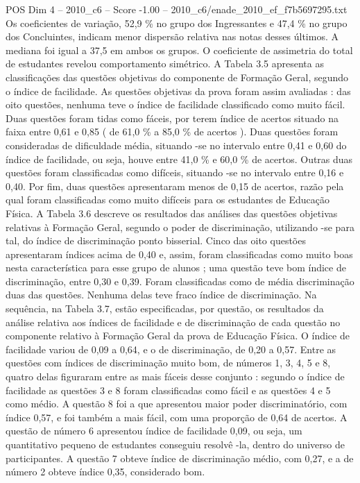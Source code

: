 \begin{textsample}{POS Dim 4 – 2010\_c6 – Score -1.00 – 2010\_c6/enade\_2010\_ef\_f7b5697295.txt}
Os coeficientes de variação, 52,9 \% no grupo dos Ingressantes e 47,4 \% no grupo dos Concluintes, indicam menor dispersão relativa nas notas desses últimos.
A mediana foi igual a 37,5 em ambos os grupos.
O coeficiente de assimetria do total de estudantes revelou comportamento simétrico.
A Tabela 3.5 apresenta as classificações das questões objetivas do componente de Formação Geral, segundo o índice de facilidade.
As questões objetivas da prova foram assim avaliadas : das oito questões, nenhuma teve o índice de facilidade classificado como muito fácil.
Duas questões foram tidas como fáceis, por terem índice de acertos situado na faixa entre 0,61 e 0,85 ( de 61,0 \% a 85,0 \% de acertos ).
Duas questões foram consideradas de dificuldade média, situando -se no intervalo entre 0,41 e 0,60 do índice de facilidade, ou seja, houve entre 41,0 \% e 60,0 \% de acertos.
Outras duas questões foram classificadas como difíceis, situando -se no intervalo entre 0,16 e 0,40.
Por fim, duas questões apresentaram menos de 0,15 de acertos, razão pela qual foram classificadas como muito difíceis para os estudantes de Educação Física.
A Tabela 3.6 descreve os resultados das análises das questões objetivas relativas à Formação Geral, segundo o poder de discriminação, utilizando -se para tal, do índice de discriminação ponto bisserial.
Cinco das oito questões apresentaram índices acima de 0,40 e, assim, foram classificadas como muito boas nesta característica para esse grupo de alunos ; uma questão teve bom índice de discriminação, entre 0,30 e 0,39.
Foram classificadas como de média discriminação duas das questões.
Nenhuma delas teve fraco índice de discriminação.
Na sequência, na Tabela 3.7, estão especificadas, por questão, os resultados da análise relativa aos índices de facilidade e de discriminação de cada questão no componente relativo à Formação Geral da prova de Educação Física.
O índice de facilidade variou de 0,09 a 0,64, e o de discriminação, de 0,20 a 0,57.
Entre as questões com índices de discriminação muito bom, de números 1, 3, 4, 5 e 8, quatro delas figuraram entre as mais fáceis desse conjunto : segundo o índice de facilidade as questões 3 e 8 foram classificadas como fácil e as questões 4 e 5 como médio.
A questão 8 foi a que apresentou maior poder discriminatório, com índice 0,57, e foi também a mais fácil, com uma proporção de 0,64 de acertos.
A questão de número 6 apresentou índice de facilidade 0,09, ou seja, um quantitativo pequeno de estudantes conseguiu resolvê -la, dentro do universo de participantes.
A questão 7 obteve índice de discriminação médio, com 0,27, e a de número 2 obteve índice 0,35, considerado bom.

\end{textsample}
